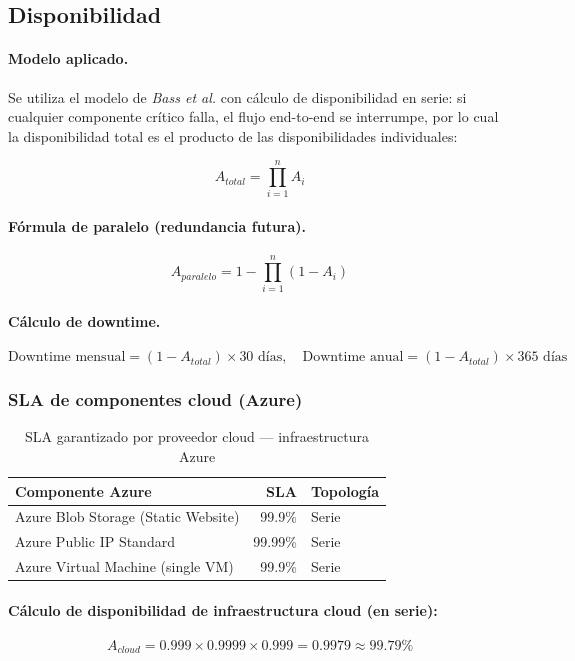 \documentclass[12pt,a4paper,oneside]{article}
\begin{document}
\subsection{Disponibilidad}

\paragraph{Modelo aplicado.} Se utiliza el modelo de \emph{Bass et al.} con c\'alculo de disponibilidad en serie: si cualquier componente cr\'itico falla, el flujo end-to-end se interrumpe, por lo cual la disponibilidad total es el producto de las disponibilidades individuales:

\[
A_{total} = \prod_{i=1}^{n} A_i
\]

\paragraph{F\'ormula de paralelo (redundancia futura).}
\[
A_{paralelo} = 1 - \prod_{i=1}^{n} (1 - A_i)
\]

\paragraph{C\'alculo de downtime.}
\[
\text{Downtime mensual} = (1 - A_{total}) \times 30 \text{ d\'ias}, \quad
\text{Downtime anual} = (1 - A_{total}) \times 365 \text{ d\'ias}
\]

\subsubsection{SLA de componentes cloud (Azure)}

\begin{table}[H]
\centering
\caption{SLA garantizado por proveedor cloud --- infraestructura Azure}
\label{tab:sla-azure}
\small
\begin{tabular}{lrl}
\toprule
\textbf{Componente Azure} & \textbf{SLA} & \textbf{Topolog\'ia} \\
\midrule
Azure Blob Storage (Static Website) & 99.9\%  & Serie \\
Azure Public IP Standard            & 99.99\% & Serie \\
Azure Virtual Machine (single VM)   & 99.9\%  & Serie \\
\bottomrule
\end{tabular}
\end{table}

\paragraph{C\'alculo de disponibilidad de infraestructura cloud (en serie):}
\[
A_{cloud} = 0.999 \times 0.9999 \times 0.999 = 0.9979 \approx \mathbf{99.79\%}
\]
\end{document}

